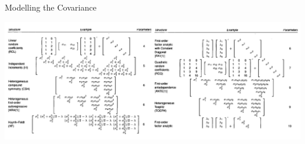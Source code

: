 \documentclass[9pt, xelatex]{beamer}
\begin{document}
{\begin{frame}[allowframebreaks]{Modelling the Covariance}
	\framebreak
	\begin{center}
		\includegraphics[scale=0.45]{Heterogeneous-Covariance-Structures.png}
	\end{center}
%
%	
%
%	

\end{frame}}
\end{document}
